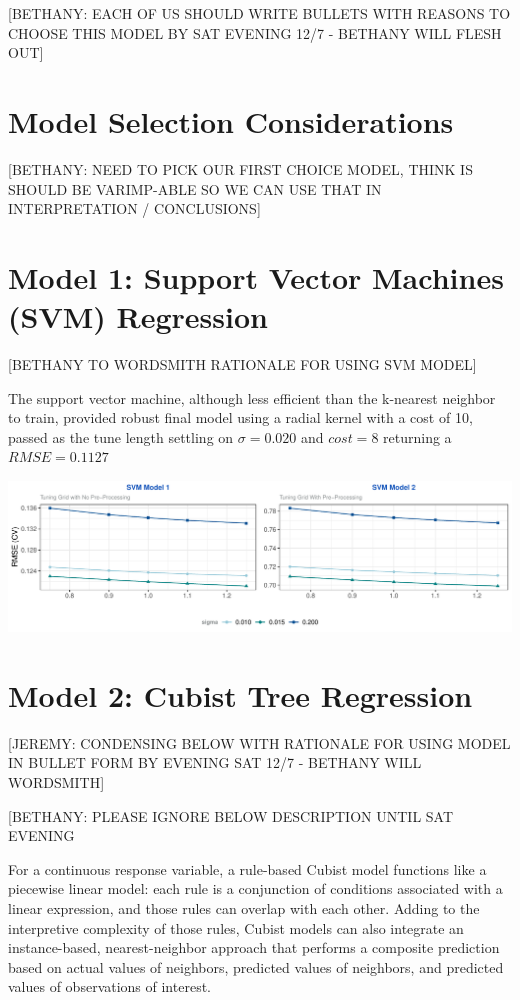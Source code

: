 \documentclass[]{report}
\begin{document}
{[}BETHANY: EACH OF US SHOULD WRITE BULLETS WITH REASONS TO CHOOSE THIS
MODEL BY SAT EVENING 12/7 - BETHANY WILL FLESH OUT{]}

\hypertarget{model-selection-considerations}{%
\section{Model Selection
Considerations}\label{model-selection-considerations}}

{[}BETHANY: NEED TO PICK OUR FIRST CHOICE MODEL, THINK IS SHOULD BE
VARIMP-ABLE SO WE CAN USE THAT IN INTERPRETATION / CONCLUSIONS{]}

\hypertarget{model-1-support-vector-machines-svm-regression}{%
\section{Model 1: Support Vector Machines (SVM)
Regression}\label{model-1-support-vector-machines-svm-regression}}

{[}BETHANY TO WORDSMITH RATIONALE FOR USING SVM MODEL{]}

The support vector machine, although less efficient than the k-nearest
neighbor to train, provided robust final model using a radial kernel
with a cost of 10, passed as the tune length settling on
\(\sigma = 0.020\) and \(cost = 8\) returning a \(RMSE = 0.1127\)

\includegraphics{CONFLICT_Project_Update_files/figure-latex/unnamed-chunk-9-1.pdf}

\hypertarget{model-2-cubist-tree-regression}{%
\section{Model 2: Cubist Tree
Regression}\label{model-2-cubist-tree-regression}}

{[}JEREMY: CONDENSING BELOW WITH RATIONALE FOR USING MODEL IN BULLET
FORM BY EVENING SAT 12/7 - BETHANY WILL WORDSMITH{]}

{[}BETHANY: PLEASE IGNORE BELOW DESCRIPTION UNTIL SAT EVENING

For a continuous response variable, a rule-based Cubist model functions
like a piecewise linear model: each rule is a conjunction of conditions
associated with a linear expression, and those rules can overlap with
each other. Adding to the interpretive complexity of those rules, Cubist
models can also integrate an instance-based, nearest-neighbor approach
that performs a composite prediction based on actual values of
neighbors, predicted values of neighbors, and predicted values of
observations of interest.
\end{document}
